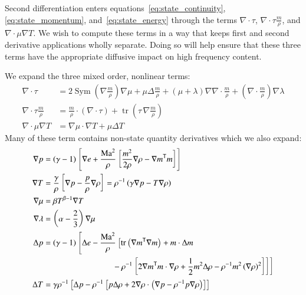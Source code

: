 \documentclass[letterpaper,11pt,nointlimits,reqno]{amsart}
\newcommand{\trans}[1]{{#1}^{\ensuremath{\mathsf{T}}}}
\newcommand{\Mach}[1][]{\ensuremath{\mbox{Ma}_{#1}}}
\newcommand{\symmetricpart}[1]
  {\ensuremath{\operatorname{Sym}\left(#1\right)}}
\DeclareMathOperator{\trace}{tr}
\begin{document}
Second differentiation enters equations~\eqref{eq:state_continuity},
\eqref{eq:state_momentum}, and~\eqref{eq:state_energy} through the terms
$\nabla\cdot\tau$, $\nabla\cdot\tau\frac{m}{\rho}$, and
$\nabla\cdot\mu\nabla{}T$.  We wish to compute these terms in a way that keeps
first and second derivative applications wholly separate.  Doing so will help
ensure that these three terms have the appropriate diffusive impact on high
frequency content.

We expand the three mixed order, nonlinear terms:
\begin{subequations}
\begin{align}
  \nabla\cdot\tau
  &=
    2 \symmetricpart{\nabla\frac{m}{\rho}}\nabla\mu
  + \mu \Delta\frac{m}{\rho}
  + \left(\mu+\lambda\right)\nabla\nabla\cdot\frac{m}{\rho}
  + \left(\nabla\cdot\frac{m}{\rho}\right)\nabla\lambda
\\
  \nabla\cdot\tau{}\frac{m}{\rho}
  &=
    \frac{m}{\rho}\cdot\left(\nabla\cdot\tau\right)
  + \trace\left( \tau\,\nabla\frac{m}{\rho} \right)
\\
  \nabla\cdot\mu\nabla{}T
  &=
    \nabla\mu\cdot\nabla{}T
  + \mu \Delta{}T
\end{align}
\end{subequations}
Many of these term contains non-state quantity derivatives which we also
expand:
\begin{subequations}
\begin{align}
  \nabla{}p &= (\gamma-1)\left[
        \nabla{}e + \frac{\Mach^{2}}{\rho} \left[
            \frac{m^{2}}{2\rho} \nabla\rho
          - \trans{\nabla{}m}m
        \right]
  \right]
\\
  \nabla{}T &= \frac{\gamma}{\rho}
               \left[ \nabla{}p - \frac{p}{\rho}\nabla\rho \right]
             = \rho^{-1}\left( \gamma\nabla{}p - T\nabla\rho \right)
\\
  \nabla\mu &= \beta{}T^{\beta-1}\nabla{}T
\\
  \nabla\lambda &= \left(\alpha-\frac{2}{3}\right)\nabla\mu
\\
  \Delta{}p
  &=
  \left(\gamma-1\right)\left[
      \Delta{}e
      - \frac{\Mach^{2}}{\rho}\left[
            \trace\left( \trans{\nabla{}m}\nabla{}m \right)
          + m\cdot\Delta{}m
\right.\right. \notag\\ &\qquad\qquad\qquad\qquad \left.\left. %
        {}- \rho^{-1}\left[
                2\trans{\nabla{}m}m\cdot\nabla{}\rho
              + \frac{1}{2} m^2 \Delta\rho
              - \rho^{-1} m^2 \left(\nabla\rho\right)^{2}
          \right]
      \right]
  \right]
\\
  \Delta{}T
  &=
  \gamma\rho^{-1}\left[
        \Delta{}p
      - \rho^{-1}\left[
            p\Delta{}\rho
          + 2\nabla{}\rho\cdot\left( \nabla{}p - \rho^{-1}p\nabla\rho \right)
      \right]
  \right]
\end{align}
\end{subequations}
\end{document}
